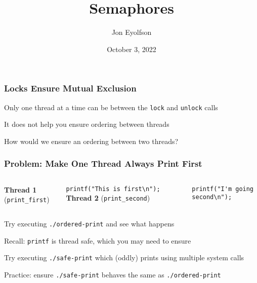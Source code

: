 

\title{Semaphores}
\author{Jon Eyolfson}
\date{October 3, 2022}


  \begin{frame}
    \titlepage
  \end{frame}

  \begin{frame}
    \frametitle{Locks Ensure Mutual Exclusion}

    Only one thread at a time can be between the \texttt{lock} and
    \texttt{unlock} calls

    \vspace{2em}

    It does not help you ensure ordering between threads

    \vspace{2em}

    How would we ensure an ordering between two threads?
  \end{frame}

  \begin{frame}[fragile]
    \frametitle{Problem: Make One Thread Always Print First}

    \begin{columns}
        {\bf Thread 1} (\verb+print_first+)

        \verb+printf("This is first\n");+
        {\bf Thread 2} (\verb+print_second+)

        \verb+printf("I'm going second\n");+
    \end{columns}

    \vspace{2em}

    Try executing \texttt{./ordered-print} and see what happens

    \vspace{4em}

    Recall: \texttt{printf} is thread safe, which you may need to ensure

    \vspace{1em}

    \hspace{2em} Try executing \texttt{./safe-print} which (oddly) prints using
                 multiple system calls

    \hspace{2em} Practice: ensure \texttt{./safe-print} behaves the same as
                 \texttt{./ordered-print}
  \end{frame}

